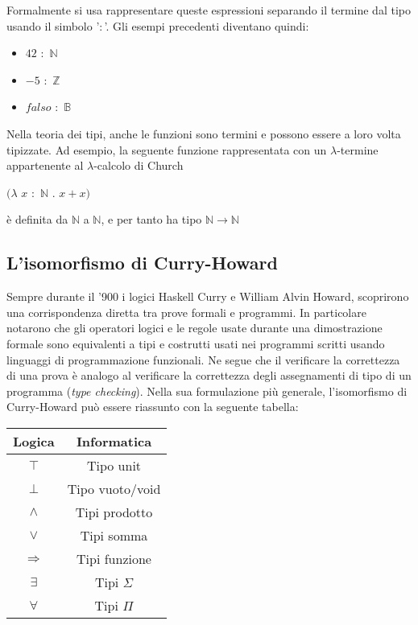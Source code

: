 \documentclass[12pt,a4paper]{report}
\begin{document}
Formalmente si usa rappresentare queste espressioni separando il termine dal tipo usando
il simbolo '$:$'. Gli esempi precedenti diventano quindi:
\begin{itemize}
  \item $42$ $:$ $\mathbb{N}$
  \item $-5$ $:$ $\mathbb{Z}$
  \item $falso$ $:$ $\mathbb{B}$ 
\end{itemize}

Nella teoria dei tipi, anche le funzioni sono termini e possono essere
a loro volta tipizzate. Ad esempio, la seguente funzione rappresentata con un $\lambda$-termine
appartenente al $\lambda$-calcolo di Church 
\begin{center}
  $(\lambda$ $x$ $:$ $\mathbb{N}$ $.$ $x + x)$
\end{center}

è definita da $\mathbb{N}$ a $\mathbb{N}$, e per tanto ha tipo $\mathbb{N} \rightarrow \mathbb{N}$

\subsection{L'isomorfismo di Curry-Howard}
Sempre durante il '900 i logici Haskell Curry e William Alvin Howard, scoprirono
una corrispondenza diretta tra prove formali e programmi. In particolare notarono
che gli operatori logici e le regole usate durante una dimostrazione formale
sono equivalenti a tipi e costrutti usati nei programmi scritti usando linguaggi
di programmazione funzionali. Ne segue che il verificare la correttezza di una
prova è analogo al verificare la correttezza degli assegnamenti di tipo di un
programma (\textit{type checking}). Nella sua formulazione più generale,
l'isomorfismo di Curry-Howard può essere riassunto con la seguente tabella:

\begin{center}
  \begin{tabular}{ | c | c |}
    \hline
    \textbf{Logica} & \textbf{Informatica} \\
    \hline
    $\top$ & Tipo unit \\
    \hline
    $\bot $ & Tipo vuoto/void \\
    \hline
   $\wedge$ & Tipi prodotto \\  
    \hline
   $\vee$ & Tipi somma \\
    \hline
   $\Rightarrow$ & Tipi funzione \\ 
    \hline
   $\exists$ & Tipi $\Sigma$ \\ 
    \hline
    $\forall $ & Tipi $\Pi$ \\ 
    \hline

  \end{tabular}
\end{center}
\end{document}
